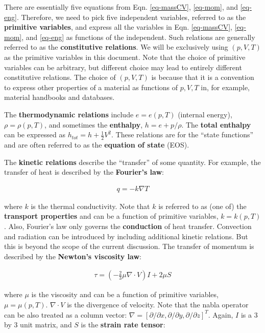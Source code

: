 \documentclass[11pt, letterpaper]{report}
\begin{document}
There are essentially five equations from Eqn. \ref{eq-massCV}, \ref{eq-mom}, and \ref{eq-eng}.
Therefore, we need to pick five independent variables, referred to as the {\bf primitive variables},
and express all the variables in Eqn.  \ref{eq-massCV}, \ref{eq-mom}, and \ref{eq-eng} as functions
of the independent. Such relations are generally referred to as the {\bf constitutive relations}. We
will be exclusively using $(p, V, T)$ as the primitive variables in this document. Note that the
choice of primitive variables can be arbitrary, but different choice may lead to entirely different
constitutive relations. The choice of $(p, V, T)$ is because that it is a convention to express
other properties of a material as functions of $p, V, T$ in, for example, material handbooks and
databases.
\paraspace

The {\bf thermodynamic relations} include $e = e(p, T)$ (internal energy), $\rho = \rho(p, T)$, and
sometimes the {\bf enthalpy}, $h = e + p/\rho$. The {\bf total enthalpy} can be expressed as
$h_{tot} = h + \tfrac{1}{2}V^2$. These relations are for the ``state functions'' and are often
referred to as the {\bf equation of state} (EOS).
\paraspace

The {\bf kinetic relations} describe the ``transfer'' of some quantity. For example, the transfer of
heat is described by the {\bf Fourier's law}:

\begin{align*}
   q = -k\nabla T
\end{align*}

where $k$ is the thermal conductivity. Note that $k$ is referred to as (one of) the {\bf transport
properties} and can be a function of primitive variables, $k = k(p,T)$. Also, Fourier's law only
governs the {\bf conduction} of heat transfer. Convection and radiation can be introduced by
including additional kinetic relations. But this is beyond the scope of the current discussion. The
transfer of momentum is described by the {\bf Newton's viscosity law}:

\begin{align*}
   \tau = \left(-\frac{2}{3}\mu \nabla \cdot V\right) I + 2 \mu S
\end{align*}

where $\mu$ is the viscosity and can be a function of primitive variables, $\mu = \mu(p, T)$.
$\nabla \cdot V$ is the divergence of velocity. Note that the nabla operator can be also treated as
a column vector: $\nabla = [\partial/\partial x, \partial/\partial y, \partial/\partial z]^T$.
Again, $I$ is a 3 by 3 unit matrix, and $S$ is the {\bf strain rate tensor}:
\end{document}
